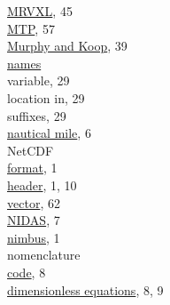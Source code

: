 \documentclass[
  english,
]{book}
\begin{document}
\href{./4-the-state-of-the-atmosphere.html\#MR}{MRVXL}, 45\\
\href{./4-the-state-of-the-atmosphere.html\#special-use-remote}{MTP},
57\\
\href{./4-the-state-of-the-atmosphere.html\#humidity}{Murphy and Koop},
39\\
\href{./4-the-state-of-the-atmosphere.html\#variable-names}{names}\\
\hspace*{0.333em}\hspace*{0.333em}variable, 29\\
\hspace*{0.333em}\hspace*{0.333em}\hspace*{0.333em}\hspace*{0.333em}location
in, 29\\
\hspace*{0.333em}\hspace*{0.333em}\hspace*{0.333em}\hspace*{0.333em}suffixes,
29\\
\href{./2-general-information-about-data-files.html\#units-and-abbreviations}{nautical
mile}, 6\\
NetCDF\\
\hspace*{0.333em}\hspace*{0.333em}\href{./introduction.html}{format},
1\\
\hspace*{0.333em}\hspace*{0.333em}\href{./introduction.html}{header}, 1,
10\\
\hspace*{0.333em}\hspace*{0.333em}\href{./5-cloud-physics-variables.html\#CRPC}{vector},
62\\
\href{./1-introduction.html}{NIDAS}, 7\\
\href{./1-introduction.html}{nimbus}, 1\\
nomenclature\\
\hspace*{0.333em}\hspace*{0.333em}\href{./2-general-information-about-data-files.html\#variable-names-in-equations}{code},
8\\
\hspace*{0.333em}\hspace*{0.333em}\href{./2-general-information-about-data-files.html\#dimensions-in-equations}{dimensionless
equations}, 8, 9\\
\end{document}
